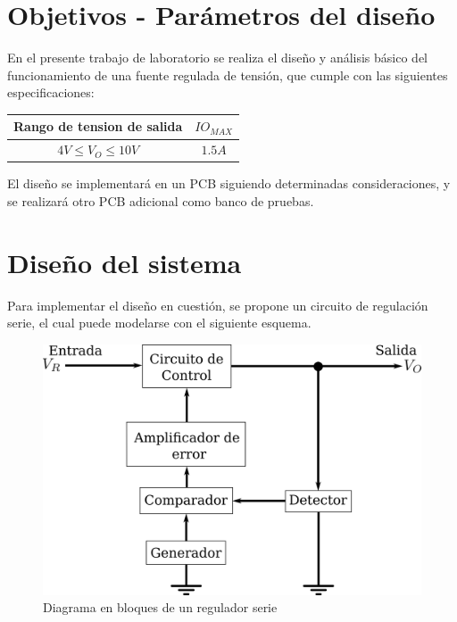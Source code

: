 



\tableofcontents
\newpage

\section{Objetivos - Par\'ametros del dise\~no}

En el presente trabajo de laboratorio se realiza el diseño y an\'alisis b\'asico del funcionamiento de una fuente regulada de tensi\'on, que cumple con las siguientes especificaciones:

\begin{center}
\begin{tabular}{|c|c|}
\hline 
Rango de tension de salida & $IO_{MAX}$\\
\hline 
\hline 
$4V \leq V_O \leq 10V$ & $1.5A$\\
\hline 
\end{tabular}
\end{center}

El diseño se implementar\'a en un PCB siguiendo determinadas consideraciones, y se realizar\'a otro PCB adicional como banco de pruebas.

\section{Dise\~no del sistema}

Para implementar el dise\~no en cuesti\'on, se propone un circuito de regulaci\'on serie, el cual puede modelarse con el siguiente esquema.

\begin{figure}[!ht]
\begin{centering}
\includegraphics[scale=0.35]{Imagenes/bloquesSerie.png}
\par\end{centering}
\caption{Diagrama en bloques de un regulador serie}

\end{figure}

